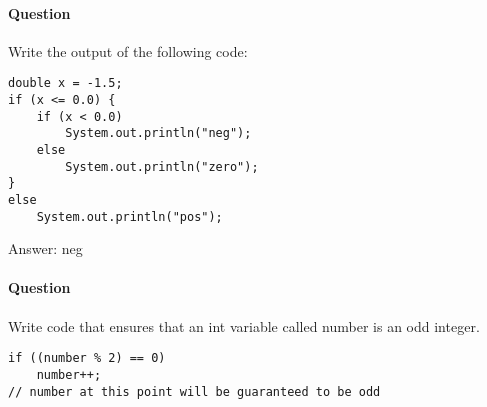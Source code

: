 \documentclass{article}
\begin{document}
\addtocounter{question_num}{1}
\paragraph{Question }
Write the output of the following code:
\begin{lstlisting}
double x = -1.5;
if (x <= 0.0) {
	if (x < 0.0)
		System.out.println("neg");
	else
		System.out.println("zero");
}
else
	System.out.println("pos");
\end{lstlisting}
{\color{red}Answer:
\newline neg
}

\addtocounter{question_num}{1}
\paragraph{Question }
Write code that ensures that an int variable called number is an odd integer.
\begin{lstlisting}
if ((number % 2) == 0)
	number++;
// number at this point will be guaranteed to be odd
\end{lstlisting}
\end{document}
